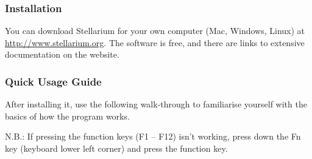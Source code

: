 \documentclass[main.tex]{subfiles}
\begin{document}
\subsubsection{Installation}
You can download Stellarium for your own computer (Mac, Windows, Linux) at \url{http://www.stellarium.org}. The software is free, and there are links to extensive documentation on the website.

\subsubsection{Quick Usage Guide} After installing it, use the following walk-through to familiarise yourself with the basics of how the program works.

N.B.: If pressing the function keys (F1 -- F12) isn't working, press down the Fn key (keyboard lower left corner) and press the function key.
\end{document}
